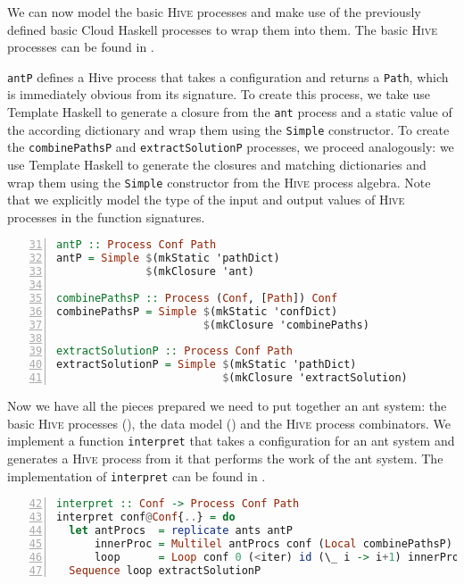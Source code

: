 We can now model the basic \textsc{Hive} processes and make use of the previously defined basic \textsf{Cloud Haskell} processes to wrap them into them. The basic \textsc{Hive} processes can be found in .

\texttt{antP} defines a \textsf{Hive} process that takes a configuration and returns a \texttt{Path}, which is immediately obvious from its signature. To create this process, we take use \textsf{Template Haskell} to generate a closure from the \texttt{ant} process and a static value of the according dictionary and wrap them using the \texttt{Simple} constructor. To create the \texttt{combinePathsP} and \texttt{extractSolutionP} processes, we proceed analogously: we use \textsf{Template Haskell} to generate the closures and matching dictionaries and wrap them using the \texttt{Simple} constructor from the \textsc{Hive} process algebra. Note that we explicitly model the type of the input and output values of \textsc{Hive} processes in the function signatures.

\begin{lstlisting}[language=Haskell,frame=tb,numbers=left,firstnumber=31,label=lst:ant_hive,caption={\textsc{Hive} processes, built on top of basic \textsf{Cloud Haskell} processes.}]
antP :: Process Conf Path
antP = Simple $(mkStatic 'pathDict)
              $(mkClosure 'ant)

combinePathsP :: Process (Conf, [Path]) Conf
combinePathsP = Simple $(mkStatic 'confDict)
                       $(mkClosure 'combinePaths)

extractSolutionP :: Process Conf Path
extractSolutionP = Simple $(mkStatic 'pathDict)
                          $(mkClosure 'extractSolution)
\end{lstlisting}

Now we have all the pieces prepared we need to put together an ant system: the basic \textsc{Hive} processes (), the data model () and the \textsc{Hive} process combinators. We implement a function \texttt{interpret} that takes a configuration for an ant system and generates a \textsc{Hive} process from it that performs the work of the ant system. The implementation of \texttt{interpret} can be found in .

\begin{lstlisting}[language=Haskell,frame=tb,numbers=left,firstnumber=42,label=lst:ant_system_complete,caption=Transformation of a configuration for an ant system into a process hierarchy.]
interpret :: Conf -> Process Conf Path
interpret conf@Conf{..} = do
  let antProcs  = replicate ants antP
      innerProc = Multilel antProcs conf (Local combinePathsP)
      loop      = Loop conf 0 (<iter) id (\_ i -> i+1) innerProc
  Sequence loop extractSolutionP
\end{lstlisting}

